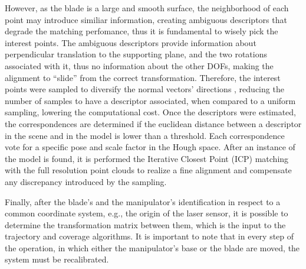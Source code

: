 However, as the blade is a large and smooth surface, the neighborhood of each
point may introduce similiar information, creating ambiguous descriptors that
degrade the matching perfomance, thus it is fundamental to wisely pick the
interest points.
The ambiguous descriptors provide information about perpendicular translation to
the supporting plane, and the two rotations associated with it, thus no
information about the other DOFs, making the alignment to ``slide'' from the
correct transformation. Therefore, the interest points were sampled to diversify
the normal vectors' directions \cite{Rusinkiewicz2001}, reducing the number of
samples to have a descriptor associated, when compared to a uniform sampling,
lowering the computational cost. Once the descriptors were estimated, the
correspondences are determined if the euclidean distance between a descriptor in
the scene and in the model is lower than a threshold. Each correspondence vote
for a specific pose and scale factor in the Hough space. After an instance of
the model is found, it is performed the Iterative Closest Point (ICP) matching
with the full resolution point clouds to realize a fine alignment and compensate
any discrepancy introduced by the sampling. 

Finally, after the blade's and the
manipulator's identification in respect to a common coordinate system, e.g., the
origin of the laser sensor, it is possible to determine the transformation
matrix between them, which is the input to the trajectory and coverage algorithms. It
is important to note that in every step of the operation, in which either the
manipulator's base or the blade are moved, the system must be recalibrated.



